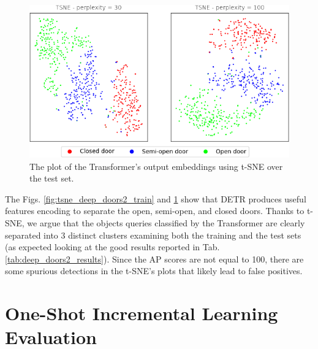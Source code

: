 \begin{figure}[h!]
	\centering
	\includegraphics[width=\linewidth]{images/deep_doors_2_tsne_testset.png}
	\caption{The plot of the Transformer's output embeddings using t-SNE over the test set.}
	\label{fig:tsne_deep_doors2_test}
\end{figure}
 
The Figs. \ref{fig:tsne_deep_doors2_train} and \ref{fig:tsne_deep_doors2_test} show that DETR produces useful features encoding to separate the open, semi-open, and closed doors. Thanks to t-SNE, we argue that the objects queries classified by the Transformer are clearly separated into 3 distinct clusters examining both the training and the test sets (as expected looking at the good results reported in Tab. \ref{tab:deep_doors2_results}). Since the AP scores are not equal to 100, there are some spurious detections in the t-SNE's plots that likely lead to false positives.

\section{One-Shot Incremental Learning Evaluation}

